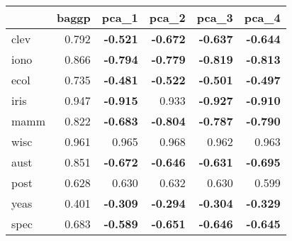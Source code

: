 \begin{tabular}{lrrrrr}
\toprule
{} &  baggp &  pca\_1 &  pca\_2 &  pca\_3 &  pca\_4 \\
\midrule
clev & 0.792 &    \textbf{-0.521} &    \textbf{-0.672} &    \textbf{-0.637} &    \textbf{-0.644} \\
iono & 0.866 &    \textbf{-0.794} &    \textbf{-0.779} &    \textbf{-0.819} &    \textbf{-0.813} \\
ecol & 0.735 &    \textbf{-0.481} &    \textbf{-0.522} &    \textbf{-0.501} &    \textbf{-0.497} \\
iris & 0.947 &    \textbf{-0.915} & 0.933 &    \textbf{-0.927} &    \textbf{-0.910} \\
mamm & 0.822 &    \textbf{-0.683} &    \textbf{-0.804} &    \textbf{-0.787} &    \textbf{-0.790} \\
wisc & 0.961 & 0.965 & 0.968 & 0.962 & 0.963 \\
aust & 0.851 &    \textbf{-0.672} &    \textbf{-0.646} &    \textbf{-0.631} &    \textbf{-0.695} \\
post & 0.628 & 0.630 & 0.632 & 0.630 & 0.599 \\
yeas & 0.401 &    \textbf{-0.309} &    \textbf{-0.294} &    \textbf{-0.304} &    \textbf{-0.329} \\
spec & 0.683 &    \textbf{-0.589} &    \textbf{-0.651} &    \textbf{-0.646} &    \textbf{-0.645} \\
\bottomrule
\end{tabular}
